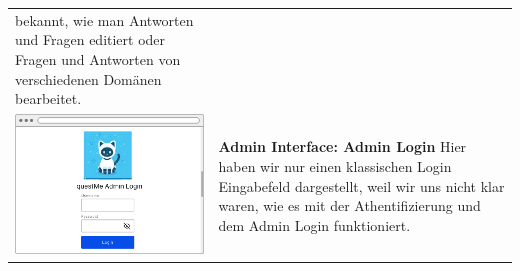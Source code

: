 \begin{tabular}{C{6cm}  L{7cm}}
    bekannt, wie man Antworten und Fragen editiert oder Fragen und Antworten von verschiedenen Domänen bearbeitet.                         \\
    \includegraphics[width=\linewidth]{bilder/old vers. UI Design/Admin Interface.png}    & \textbf{Admin Interface: Admin Login} \newline
    Hier haben wir nur einen klassischen Login Eingabefeld dargestellt, weil wir uns nicht klar waren, wie es mit der Athentifizierung und dem Admin
    Login funktioniert.
\end{tabular}


